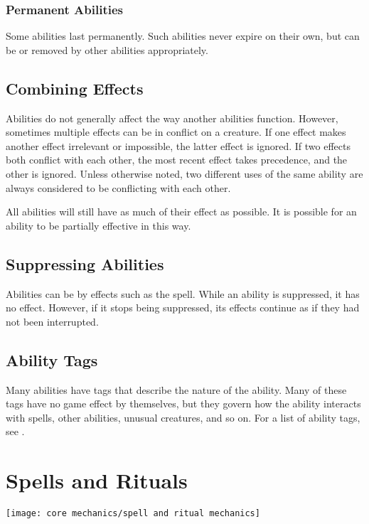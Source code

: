     \subsubsection{Permanent Abilities}
      Some abilities last permanently.
      Such abilities never expire on their own, but can be  or removed by other abilities appropriately.

  \subsection{Combining Effects}
    Abilities do not generally affect the way another abilities function.
    However, sometimes multiple effects can be in conflict on a creature.
    If one effect makes another effect irrelevant or impossible, the latter effect is ignored.
    If two effects both conflict with each other, the most recent effect takes precedence, and the other is ignored.
    Unless otherwise noted, two different uses of the same ability are always considered to be conflicting with each other.

    All abilities will still have as much of their effect as possible.
    It is possible for an ability to be partially effective in this way.

  \subsection{Suppressing Abilities}\label{Suppressing Abilities}
    Abilities can be  by effects such as the  spell.
    While an ability is suppressed, it has no effect.
    However, if it stops being suppressed, its effects continue as if they had not been interrupted.

  \subsection{Ability Tags}
    Many abilities have tags that describe the nature of the ability.
    Many of these tags have no game effect by themselves, but they govern how the ability interacts with spells, other abilities, unusual creatures, and so on.
    For a list of ability tags, see .

\section{Spells and Rituals}\label{Spells and Rituals}
  \texttt{[image: core mechanics/spell and ritual mechanics]}

